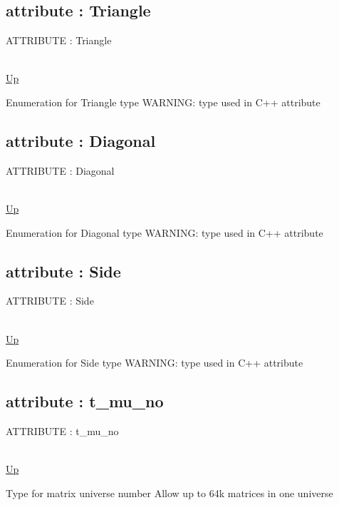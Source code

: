 \subsection*{attribute : Triangle}
\hypertarget{ecldoc:ecldoc-Triangle}{ATTRIBUTE : Triangle} \\
\hyperlink{ecldoc:PBblas.Types}{Up} \\
\par
Enumeration for Triangle type WARNING: type used in C++ attribute \\
\subsection*{attribute : Diagonal}
\hypertarget{ecldoc:ecldoc-Diagonal}{ATTRIBUTE : Diagonal} \\
\hyperlink{ecldoc:PBblas.Types}{Up} \\
\par
Enumeration for Diagonal type WARNING: type used in C++ attribute \\
\subsection*{attribute : Side}
\hypertarget{ecldoc:ecldoc-Side}{ATTRIBUTE : Side} \\
\hyperlink{ecldoc:PBblas.Types}{Up} \\
\par
Enumeration for Side type WARNING: type used in C++ attribute \\
\subsection*{attribute : t\_mu\_no}
\hypertarget{ecldoc:pbblas.types.t_mu_no}{ATTRIBUTE : t\_mu\_no} \\
\hyperlink{ecldoc:PBblas.Types}{Up} \\
\par
Type for matrix universe number Allow up to 64k matrices in one universe \\
